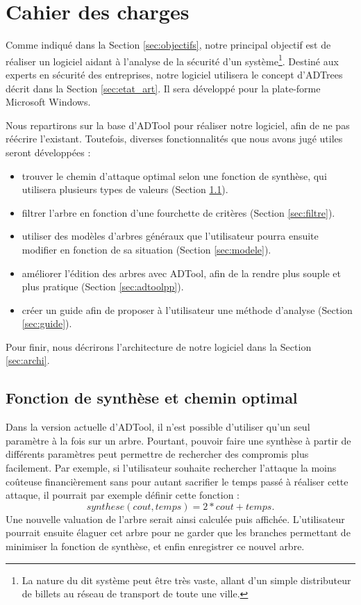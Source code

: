 \section{Cahier des charges}
    \label{sec:cahier}

    Comme indiqué dans la Section \ref{sec:objectifs}, notre principal objectif est de réaliser un logiciel aidant à l'analyse de la sécurité d'un système\footnote{La nature du dit système peut être très vaste, allant d'un simple distributeur de billets au réseau de transport de toute une ville.}. Destiné aux experts en sécurité des entreprises, notre logiciel utilisera le concept d'ADTrees décrit dans la Section \ref{sec:etat_art}. Il sera développé pour la plate-forme Microsoft Windows.

    Nous repartirons sur la base d'ADTool pour réaliser notre logiciel, afin de ne pas réécrire l'existant. Toutefois, diverses fonctionnalités que nous avons jugé utiles seront développées :
    \begin{itemize}
        \item trouver le chemin d'attaque optimal selon une fonction de synthèse, qui utilisera plusieurs types de valeurs (Section \ref{sec:fct_synth}).
        \item filtrer l'arbre en fonction d'une fourchette de critères (Section \ref{sec:filtre}).
        \item utiliser des modèles d'arbres généraux que l'utilisateur pourra ensuite modifier en fonction de sa situation (Section \ref{sec:modele}).
        \item améliorer l'édition des arbres avec ADTool, afin de la rendre plus souple et plus pratique (Section \ref{sec:adtoolpp}).
        \item créer un guide afin de proposer à l'utilisateur une méthode d'analyse (Section \ref{sec:guide}).
    \end{itemize}

    Pour finir, nous décrirons l'architecture de notre logiciel dans la Section \ref{sec:archi}.

    \subsection{Fonction de synthèse et chemin optimal}
        \label{sec:fct_synth}

        Dans la version actuelle d'ADTool, il n'est possible d'utiliser qu'un seul paramètre à la fois sur un arbre. Pourtant, pouvoir faire une synthèse à partir de différents paramètres peut permettre de rechercher des compromis plus facilement. Par exemple, si l'utilisateur souhaite rechercher l'attaque la moins coûteuse financièrement sans pour autant sacrifier le temps passé à réaliser cette attaque, il pourrait par exemple définir cette fonction : \[ synthese(cout, temps) = 2*cout + temps . \]
        Une nouvelle valuation de l'arbre serait ainsi calculée puis affichée. L'utilisateur pourrait ensuite élaguer cet arbre pour ne garder que les branches permettant de minimiser la fonction de synthèse, et enfin enregistrer ce nouvel arbre.

